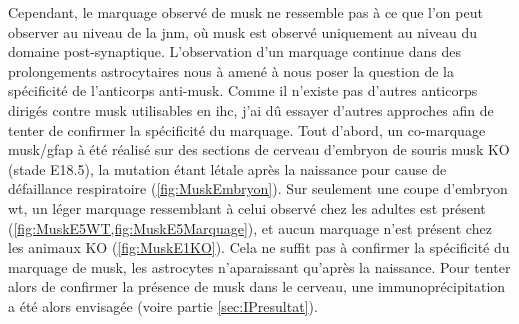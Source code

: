 	Cependant, le marquage observé de \gls{musk} ne ressemble pas à ce que l'on peut observer au niveau de la \gls{jnm}, où \gls{musk} est observé uniquement au niveau du domaine post-synaptique. L'observation d'un marquage continue dans des prolongements astrocytaires nous à amené à nous poser la question de la spécificité de l'anticorps anti-\gls{musk}. Comme il n'existe pas d'autres anticorps dirigés contre \gls{musk} utilisables en \gls{ihc}, j'ai dû essayer d'autres approches afin de tenter de confirmer la spécificité du marquage. Tout d'abord, un co-marquage \gls{musk}/\acrshort{gfap} à été réalisé sur des sections de cerveau d'embryon de souris \gls{musk} KO (stade E18.5), la mutation étant létale après la naissance pour cause de défaillance respiratoire (\cref{fig:MuskEmbryon}). Sur seulement une coupe d'embryon \gls{wt}, un léger marquage ressemblant à celui observé chez les adultes est présent (\cref{fig:MuskE5WT,fig:MuskE5Marquage}), et aucun marquage n'est présent chez les animaux KO (\cref{fig:MuskE1KO}). Cela ne suffit pas à confirmer la spécificité du marquage de \gls{musk}, les astrocytes n'aparaissant qu'après la naissance. Pour tenter alors de confirmer la présence de \gls{musk} dans le cerveau, une immunoprécipitation a été alors envisagée (voire partie \cref{sec:IPresultat}).
	
